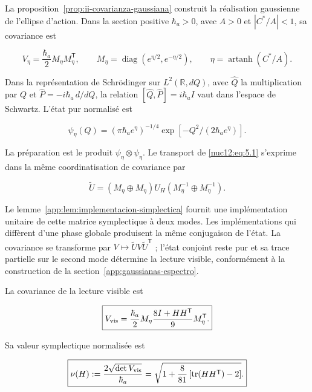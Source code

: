 La proposition~\ref{prop:ii-covarianza-gaussiana} construit la réalisation gaussienne de l’ellipse d’action. Dans la section positive \(\hbar_a>0\), avec \(A>0\) et \(|C^*/A|<1\), sa covariance est




\begin{equation}
V_\eta=\frac{\hbar_a}{2}M_\eta M_\eta^{\mathsf T},\qquad
M_\eta=\operatorname{diag}(e^{\eta/2},e^{-\eta/2}),\qquad
\eta=\operatorname{artanh}(C^*/A).
\label{nuc12:eq:5.4}
\end{equation}



Dans la représentation de Schrödinger sur \(L^2(\mathbb R,dQ)\), avec \(\widehat Q\) la multiplication par \(Q\) et \(\widehat P=-i\hbar_a\,d/dQ\), la relation \([\widehat Q,\widehat P]=i\hbar_a I\) vaut dans l’espace de Schwartz. L’état pur normalisé est



\[
\psi_\eta(Q)=(\pi\hbar_a e^\eta)^{-1/4}
\exp[-Q^2/(2\hbar_a e^\eta)].
\]



La préparation est le produit \(\psi_\eta\otimes\psi_\eta\). Le transport de \eqref{nuc12:eq:5.1} s’exprime dans la même coordinatisation de covariance par



\begin{equation}
\widetilde U=(M_\eta\oplus M_\eta)U_H
(M_\eta^{-1}\oplus M_\eta^{-1}).
\label{nuc12:eq:5.5}
\end{equation}



Le lemme~\ref{app:lem:implementacion-simplectica} fournit une implémentation unitaire de cette matrice symplectique à deux modes. Les implémentations qui diffèrent d’une phase globale produisent la même conjugaison de l’état. La covariance se transforme par \(V\mapsto\widetilde U V\widetilde U^{\mathsf T}\) ; l’état conjoint reste pur et sa trace partielle sur le second mode détermine la lecture visible, conformément à la construction de la section~\ref{app:gaussianas-espectro}.

\begin{theorem}

La covariance de la lecture visible est



\begin{equation}
\boxed{V_{\rm vis}=
\frac{\hbar_a}{2}M_\eta
\frac{8I+HH^{\mathsf T}}9
M_\eta^{\mathsf T}.}
\label{nuc12:eq:5.6}
\end{equation}



Sa valeur symplectique normalisée est



\begin{equation}
\boxed{\nu(H):=\frac{2\sqrt{\det V_{\rm vis}}}{\hbar_a}
=\sqrt{1+\frac8{81}\left[\operatorname{tr}(HH^{\mathsf T})-2\right]}.}
\label{nuc12:eq:5.7}
\end{equation}
\end{theorem}



